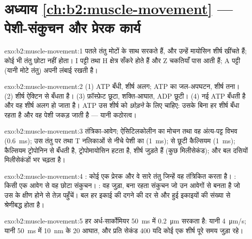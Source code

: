 \section*{अध्याय \ref{ch:b2:muscle-movement} --- पेशी-संकुचन और प्रेरक कार्य}

\begin{solution}{exo:b2:muscle-movement:1}
पतले तंतु मोटों के साथ सरकते हैं, और उन्हें मायोसिन शीर्ष खींचते हैं;
कोई भी तंतु छोटा नहीं होता। I पट्टी तथा H क्षेत्र सँकरे होते हैं और
Z चकतियाँ पास आती हैं; A पट्टी (यानी मोटे तंतु) अपनी लंबाई रखती है।
\end{solution}

\begin{solution}{exo:b2:muscle-movement:2}
(1) ATP बँधी, शीर्ष अलग; ATP का जल-अपघटन, शीर्ष तना। (2) शीर्ष
ऐक्टिन से बँधता है। (3) फ़ॉस्फ़ेट छूटा, शक्ति-आघात, ADP छूटी।
(4) नई ATP बँधती है और वह शीर्ष अलग हो जाता है। ATP उस शीर्ष को
\emph{छोड़ने} के लिए चाहिए: उसके बिना हर शीर्ष बँधा रहता है और वह
पेशी जकड़ जाती है --- यानी कठोरत्व।
\end{solution}

\begin{solution}{exo:b2:muscle-movement:3}
तंत्रिका-आवेग; ऐसिटिलकोलीन का मोचन तथा वह अंत्य-पट्ट विभव
(\qty{0.6}{ms}); उस तंतु पर तथा T नलिकाओं से नीचे पेशी का
 (\qty{1}{ms});  से छूटी कैल्सियम
(\qty{1}{ms}); कैल्सियम ट्रोपोनिन से बँधती है, ट्रोपोमायोसिन हटता है,
शीर्ष जुड़ते हैं (कुछ मिलीसेकंड); और बल दसियों मिलीसेकंडों भर
चढ़ता है।
\end{solution}

\begin{solution}{exo:b2:muscle-movement:4}
: कोई एक प्रेरक  और वे सारे तंतु जिन्हें वह तंत्रिकित करता है।
: किसी एक आवेग से वह छोटा संकुचन। : वह
जुड़ा, बना रहता संकुचन जो उन आवेगों से बनता है जो उस  के
क्षीण होने से तेज़ पहुँचें। बल हर इकाई की दगने की दर से और
 हुई इकाइयों की संख्या से श्रेणीबद्ध होता है।
\end{solution}

\begin{solution}{exo:b2:muscle-movement:5}
हर अर्ध-सार्कोमियर \qty{50}{ms} में \qty{0.2}{\micro m} सरकता है:
यानी \qty{4}{\micro m/s}; यानी \qty{50}{ms} में \qty{10}{nm} के 20 आघात,
और प्रति सेकंड 400 यदि कोई एक शीर्ष पूरे समय जुड़ा रहे।
\end{solution}

